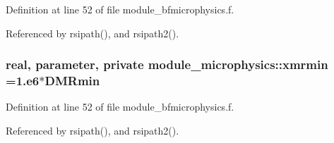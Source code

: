 Definition at line 52 of file module\+\_\+bfmicrophysics.\+f.



Referenced by rsipath(), and rsipath2().

\subsubsection[{\texorpdfstring{xmrmin}{xmrmin}}]{\setlength{\rightskip}{0pt plus 5cm}real, parameter, private module\+\_\+microphysics\+::xmrmin =1.e6$\ast$D\+M\+Rmin\hspace{0.3cm}{\ttfamily [private]}}\hypertarget{namespacemodule__microphysics_a77fb6cadd143fc66a45cfdae1569cd81}{}\label{namespacemodule__microphysics_a77fb6cadd143fc66a45cfdae1569cd81}


Definition at line 52 of file module\+\_\+bfmicrophysics.\+f.



Referenced by rsipath(), and rsipath2().

